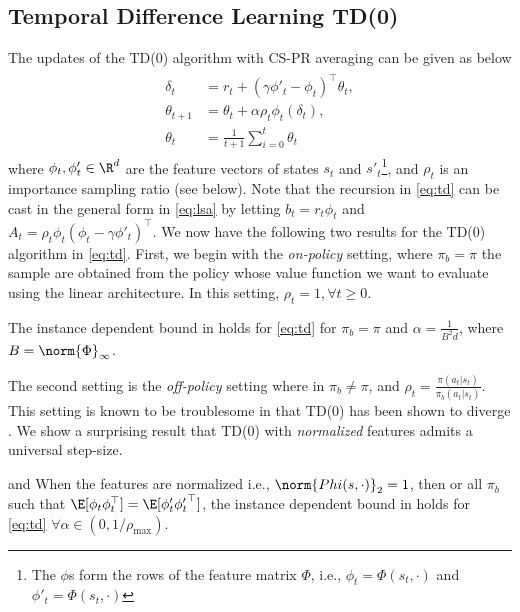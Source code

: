 \subsection{Temporal Difference Learning TD(0)}
The updates of the TD(0) algorithm with CS-PR averaging can be given as below
\begin{align}\label{eq:td}
\begin{split}
\delta_t&=r_t+(\gamma \phi'_t-\phi_t)^\top \theta_t,\\
\theta_{t+1}&=\theta_t+\alpha \rho_t\phi_t (\delta_t),\\
\theta_{t}&=\frac{1}{t+1}\sum_{i=0}^t \theta_t
\end{split}
\end{align}
where $\phi_t, \phi'_t\in \R^d$ are the feature vectors of states $s_t$ and $s'_t$\footnote{The $\phi$s form the rows of the feature matrix $\Phi$, i.e., $\phi_t=\Phi(s_t,\cdot)$ and $\phi'_t=\Phi(s_t,\cdot)$}, and $\rho_t$ is an importance sampling ratio (see below).
Note that the recursion in \eqref{eq:td} can be cast in the general form in \eqref{eq:lsa} by letting $b_t=r_t \phi_t$ and $A_t=\rho_t\phi_t(\phi_t-\gamma\phi'_t)^\top$. 
We now have the following two results for the TD(0) algorithm in \eqref{eq:td}. First, we begin with the \emph{on-policy} setting, where $\pi_b=\pi$ the sample are obtained from the policy whose value function we want to evaluate using the linear architecture. In this setting, $\rho_t=1,\forall t\geq 0$.
\begin{theorem}\label{th:tdon}
The instance dependent bound in  holds for \eqref{eq:td} for $\pi_b=\pi$ and $\alpha=\frac{1}{B^2 d}$, where $B=\norm{\Phi}_\infty$.
\end{theorem}
The second setting is the \emph{off-policy} setting where in $\pi_b\neq \pi$, and $\rho_t=\frac{\pi(a_t|s_t)}{\pi_b(a_t|s_t)}$. This setting is known to be troublesome in that TD(0) has been shown to diverge \cite{baird}. We show a surprising result that TD(0) with \emph{normalized} features admits a universal step-size.
\begin{theorem}\label{th:tdoff}
 and When the features are normalized i.e., $\norm{Phi(s,\cdot)}_2=1$, then or all $\pi_b$ such that $\E[\phi_t\phi_t^\top]=\E[\phi'_t {\phi'_t}^\top]$, the instance dependent bound in  holds for \eqref{eq:td} $\forall \alpha\in (0,1/\rho_{\max})$.
\end{theorem}
